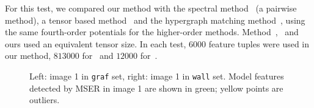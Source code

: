 For this test, we compared our method with the spectral method~\cite{Cour06} (a pairwise method), a tensor based method~\cite{Duchenne_etal09} and the hypergraph matching method~\cite{Zass08}, using the same fourth-order potentials for the higher-order methods. Method~\cite{Duchenne_etal09},~\cite{Zass08} and ours used an equivalent tensor size. In each test, $6000$ feature tuples were used in our method, $813000$ for~\cite{Duchenne_etal09} and $12000$ for~\cite{Zass08}.
%
\begin{figure}[!t]
\setlength{\abovecaptionskip}{0mm}
\setlength{\belowcaptionskip}{-2mm}
\centering
\setlength\subfigcapskip{-2mm}
\hspace{-5ex}
         \begin{minipage}[b]{0.4\textwidth}
        \end{minipage}%
         \hspace{10mm}%
         \begin{minipage}[b]{0.4\textwidth}
        \end{minipage}%
        \caption{Left: image 1 in \texttt{graf} set, right: image 1 in \texttt{wall} set. Model features detected by MSER in image 1 are shown in green; yellow points are outliers.}
\label{fig:mini:subfig_affinematching1} %
\end{figure}%
